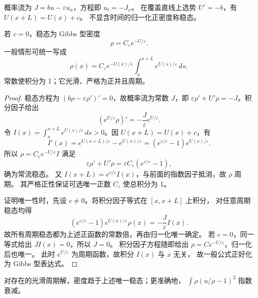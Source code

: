\begin{definition}
概率流为 $J=bu-\varepsilon u_x$，方程即 $u_t=-J_x$。
在覆盖直线上选势 $U'=-b$，有 $U(x+L)=U(x)+c$。
不显含时间的归一化正密度称稳态。
\end{definition}
\begin{proposition}
若 $c=0$，稳态为 Gibbs 型密度
\[
 \rho=C_\varepsilon e^{-U/\varepsilon}.
\]
一般情形可统一写成
\[
 \rho(x)=C_\varepsilon e^{-U(x)/\varepsilon}
 \int_x^{x+L}e^{U(s)/\varepsilon}\,ds,
\]
常数使积分为 1；它光滑、严格为正并且周期。
\end{proposition}
\begin{proof}
稳态方程为 $(b\rho-\varepsilon\rho')'=0$，故概率流为常数 $J$，即
$\varepsilon\rho'+U'\rho=-J$。积分因子给出
\[
 (e^{U/\varepsilon}\rho)'=-\frac{J}{\varepsilon}e^{U/\varepsilon}.
\]
令 $I(x)=\displaystyle\int_x^{x+L}e^{U(s)/\varepsilon}\,ds>0$。因 $U(x+L)=U(x)+c$，有
\[
 I'(x)=e^{U(x+L)/\varepsilon}-e^{U(x)/\varepsilon}
 =(e^{c/\varepsilon}-1)e^{U(x)/\varepsilon}.
\]
所以 $\rho=C_\varepsilon e^{-U/\varepsilon}I$ 满足
\[
 \varepsilon\rho'+U'\rho=\varepsilon C_\varepsilon(e^{c/\varepsilon}-1),
\]
确为常流稳态。
又 $I(x+L)=e^{c/\varepsilon}I(x)$，与前面的指数因子抵消，故 $\rho$ 周期。
其严格正性保证可选唯一正数 $C_\varepsilon$ 使总积分为 1。

证明唯一性时，先设 $c\ne0$。将积分因子等式在 $[x,x+L]$ 上积分，
对任意周期稳态均得
\[
 (e^{c/\varepsilon}-1)e^{U(x)/\varepsilon}\rho(x)
 =-\frac{J}{\varepsilon}I(x).
\]
故所有周期稳态都为上述正函数的常数倍，再由归一化唯一确定。
若 $c=0$，同一等式给出 $JI(x)=0$，所以 $J=0$。
积分因子方程随即给出 $\rho=C e^{-U/\varepsilon}$，归一化后也唯一。
此时 $e^{U/\varepsilon}$ 为周期函数，故积分 $I(x)$ 与 $x$ 无关，
故一般公式正好化为 Gibbs 型表达式。
\end{proof}
\begin{theorem}[稳态的吸引性]
对存在的光滑周期解，密度趋于上述唯一稳态；更准确地，
$\displaystyle\int\rho(u/\rho-1)^2$ 指数衰减。
\end{theorem}
